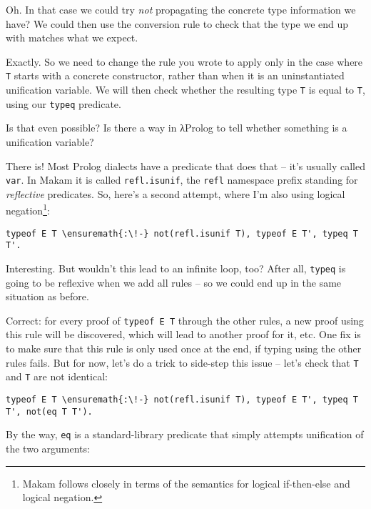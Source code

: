 \heroSTUDENT{} Oh. In that case we could try \emph{not} propagating the
concrete type information we have? We could then use the conversion rule
to check that the type we end up with matches what we expect.

\heroADVISOR{} Exactly. So we need to change the rule you wrote to apply only
in the case where \texttt{T} starts with a concrete constructor, rather
than when it is an uninstantiated unification variable. We will then
check whether the resulting type \texttt{T\textquotesingle{}} is equal
to \texttt{T}, using our \texttt{typeq} predicate.

\heroSTUDENT{} Is that even possible? Is there a way in \foreignlanguage{greek}{λ}Prolog to tell
whether something is a unification variable?

\heroADVISOR{} There is! Most Prolog dialects have a predicate that does that
-- it's usually called \texttt{var}. In Makam it is called
\texttt{refl.isunif}, the \texttt{refl} namespace prefix standing for
\emph{reflective} predicates. So, here's a second attempt, where I'm
also using logical
negation\footnote{Makam follows \citet{kiselyov05backtracking} closely in terms of the semantics for logical if-then-else and logical negation.}:

\begin{verbatim}
typeof E T \ensuremath{:\!-} not(refl.isunif T), typeof E T', typeq T T'.
\end{verbatim}

\heroSTUDENT{} Interesting. But wouldn't this lead to an infinite loop, too?
After all, \texttt{typeq} is going to be reflexive when we add all rules
-- so we could end up in the same situation as before.

\heroADVISOR{} Correct: for every proof of
\texttt{typeof\ E\ T\textquotesingle{}} through the other rules, a new
proof using this rule will be discovered, which will lead to another
proof for it, etc. One fix is to make sure that this rule is only used
once at the end, if typing using the other rules fails. But for now,
let's do a trick to side-step this issue -- let's check that \texttt{T}
and \texttt{T\textquotesingle{}} are not identical:

\begin{verbatim}
typeof E T \ensuremath{:\!-} not(refl.isunif T), typeof E T', typeq T T', not(eq T T').
\end{verbatim}

By the way, \texttt{eq} is a standard-library predicate that simply
attempts unification of the two arguments:

